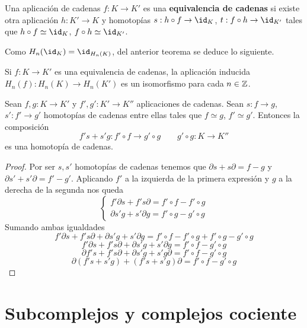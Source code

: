 \begin{definicion}
	Una aplicación de cadenas $f: K \rightarrow K'$ es una \textbf{equivalencia de cadenas} si existe otra aplicación $h: K' \rightarrow K$ y homotopías $s: h \circ f \rightarrow \id_K$, $t: f \circ h \rightarrow \id_{K'}$ tales que $h \circ f \simeq \id_K$, $f \circ h \simeq \id_{K'}$.
\end{definicion}

Como $H_n(\id_K) = \id_{H_n(K)}$, del anterior teorema se deduce lo siguiente.

\begin{corolario}
	Si $f: K \rightarrow K'$ es una equivalencia de cadenas, la aplicación inducida $H_n(f): H_n(K) \rightarrow H_n(K')$ es un isomorfismo para cada $n \in \mathbb{Z}$.
\end{corolario}

\begin{proposicion}
	Sean $f,g: K \rightarrow K'$ y $f',g': K' \rightarrow K''$ aplicaciones de cadenas. Sean $s: f \rightarrow g$, $s': f' \rightarrow g'$ homotopías de cadenas entre ellas tales que $f \simeq g$, $f' \simeq g'$. Entonces la composición
	\[ f' s + s' g: f' \circ f \rightarrow g' \circ g \qquad g' \circ g : K \rightarrow K'' \]
	es una homotopía de cadenas.
\end{proposicion}
\begin{proof}
	Por ser $s,s'$ homotopías de cadenas tenemos que $\partial s + s\partial = f-g$ y $\partial s' + s'\partial = f'-g'$. Aplicando  $f'$ a la izquierda de la primera expresión y $g$ a la derecha de la segunda nos queda
	\begin{equation}
		\begin{cases}
			 f'\partial s + f's\partial = f' \circ f-f' \circ g \\
			 \partial s' g + s'\partial g = f' \circ g-g' \circ g 
		\end{cases}
	\end{equation}
	Sumando ambas igualdades
	\[ f'\partial s + f's\partial + \partial s' g + s'\partial g = f' \circ f-f' \circ g + f' \circ g-g' \circ g \]
	\[ f'\partial s + f's\partial + \partial s' g + s'\partial g = f' \circ f - g' \circ g \]
	\[ \partial f' s + f's \partial + \partial s' g + s' g \partial = f' \circ f - g' \circ g \]
	\[ \partial (f' s + s' g) + (f's + s' g) \partial = f' \circ f - g' \circ g \]
\end{proof}

\section{Subcomplejos y complejos cociente}

